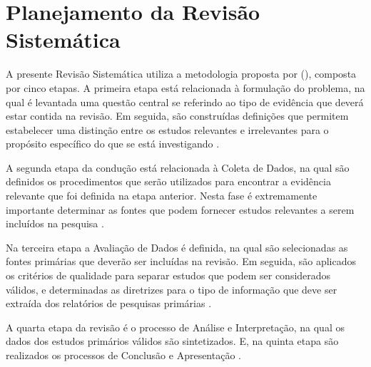 \documentclass[
	12pt,				%
	oneside,			%
	a4paper,			%
	english,			%
	brazil				%
	]{abntex2ppgsi}
\begin{document}


\section{Planejamento da Revisão Sistemática}
\label{planejamento}
A presente Revisão Sistemática utiliza a metodologia proposta por \citeauthor{biolchini2005techincal} (\citeyear{biolchini2005techincal}), composta por cinco etapas.
A primeira etapa está relacionada à formulação do problema, na qual é levantada uma questão central se referindo ao tipo de evidência que deverá  estar contida na revisão. Em seguida, são construídas definições que permitem estabelecer uma distinção entre os estudos relevantes e irrelevantes para o propósito específico do que se está investigando \cite{biolchini2005techincal}.

A segunda etapa da condução está relacionada à Coleta de Dados, na qual são definidos os procedimentos que serão utilizados para encontrar a evidência relevante que foi definida na etapa anterior. Nesta fase é extremamente importante determinar as fontes que podem fornecer estudos relevantes a serem incluídos na pesquisa \cite{biolchini2005techincal}.

Na terceira etapa a Avaliação de Dados é definida, na qual são selecionadas as fontes primárias que deverão ser incluídas na revisão. Em seguida,  são aplicados os critérios de qualidade para separar estudos que podem ser considerados válidos, e determinadas as diretrizes para o tipo de informação que deve ser extraída dos relatórios de pesquisas primárias \cite{biolchini2005techincal}.

A quarta etapa da revisão é o processo de Análise e Interpretação, na qual os dados dos estudos primários válidos são sintetizados. E, na quinta etapa são realizados os processos de Conclusão e Apresentação \cite{biolchini2005techincal}.
\end{document}
